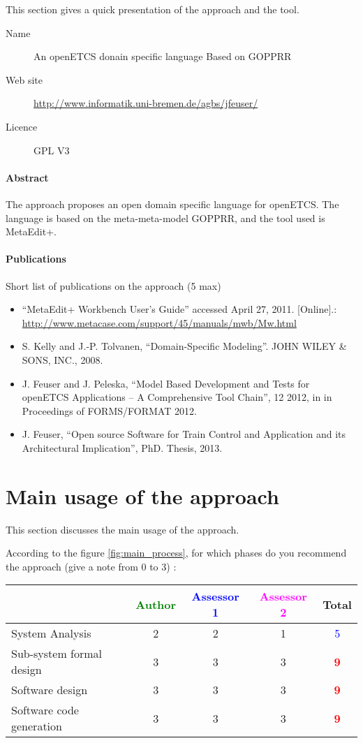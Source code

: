 This section gives a quick presentation of the approach and the tool.

\begin{description}
\item[Name] An openETCS donain specific language Based on GOPPRR
\item[Web site] \url{http://www.informatik.uni-bremen.de/agbs/jfeuser/}
\item[Licence] GPL V3
\end{description}

\paragraph{Abstract} 
The approach proposes an open  domain specific language for
openETCS. The language is based on the meta-meta-model  GOPPRR, and the
tool used is MetaEdit+.


\paragraph{Publications} Short list of publications on the approach (5 max)
\begin{itemize}
\item ``MetaEdit+ Workbench User’s Guide'' accessed April 27, 2011. [Online].:
\url{http://www.metacase.com/support/45/manuals/mwb/Mw.html}
\item S. Kelly and J.-P. Tolvanen, ``Domain-Specific Modeling''. JOHN WILEY \& SONS, INC.,
2008.
\item J. Feuser and J. Peleska, ``Model Based Development and Tests for openETCS Applications
– A Comprehensive Tool Chain'', 12 2012, in in Proceedings of FORMS/FORMAT 2012.
\item J. Feuser, ``Open source Software for Train Control and
  Application and its Architectural Implication'', PhD. Thesis, 2013.
\end{itemize}


\section{Main usage of the approach}
\label{main_usage}
This section discusses the main usage of the approach.

According to the figure \ref{fig:main_process}, for which phases do you recommend the approach (give a note from 0 to  3) :

\begin{tabular}{|l | c | c | c | c|}
\hline
& \textcolor{green}{Author} & \textcolor{blue}{Assessor 1} & \textcolor{magenta}{Assessor 2} & Total \\
\hline 
System Analysis &
2 &2 & 1    & \textcolor{blue}{5} \\
\hline
Sub-system formal design &3 &3 & 3    &  \textcolor{red}{\textbf{9}} \\
\hline
Software design &3 &3 & 3    & \textcolor{red}{\textbf{9}} \\
\hline
Software code generation &3 &3 & 3    & \textcolor{red}{\textbf{9}} \\
\hline
\end{tabular}

